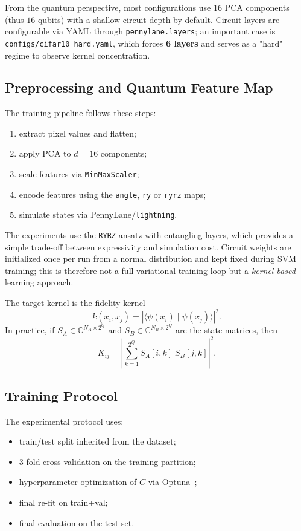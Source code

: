\documentclass[10pt,twocolumn,letterpaper]{article}
\begin{document}
From the quantum perspective, most configurations use $16$ PCA components (thus $16$ qubits) with a shallow circuit depth by default. Circuit layers are configurable via YAML through \texttt{pennylane.layers}; an important case is \texttt{configs/cifar10\_hard.yaml}, which forces \textbf{6 layers} and serves as a "hard" regime to observe kernel concentration.

\subsection{Preprocessing and Quantum Feature Map}
The training pipeline follows these steps:
\begin{enumerate}
    \item extract pixel values and flatten;
    \item apply PCA to $d=16$ components;
    \item scale features via \texttt{MinMaxScaler};
    \item encode features using the \texttt{angle}, \texttt{ry} or \texttt{ryrz} maps;
    \item simulate states via PennyLane/\texttt{lightning}.
\end{enumerate}

The experiments use the \texttt{RYRZ} ansatz with entangling layers, which provides a simple trade-off between expressivity and simulation cost. Circuit weights are initialized once per run from a normal distribution and kept fixed during SVM training; this is therefore not a full variational training loop but a \emph{kernel-based} learning approach.

The target kernel is the fidelity kernel
\[
k(x_i, x_j) = \left|\langle \psi(x_i) \mid \psi(x_j) \rangle \right|^2.
\]
In practice, if $S_A \in \mathbb{C}^{N_A \times 2^Q}$ and $S_B \in \mathbb{C}^{N_B \times 2^Q}$ are the state matrices, then
\[
K_{ij} = \left| \sum_{k=1}^{2^Q} S_A[i,k]\;\overline{S_B[j,k]} \right|^2.
\]

\subsection{Training Protocol}
The experimental protocol uses:
\begin{itemize}
    \item train/test split inherited from the dataset;
    \item 3-fold cross-validation on the training partition;
    \item hyperparameter optimization of $C$ via Optuna~\cite{akiba2019optuna};
    \item final re-fit on train+val;
    \item final evaluation on the test set.
\end{itemize}
\end{document}
